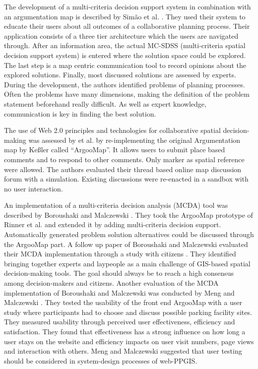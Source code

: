 The development of a multi-criteria decision support system in combination with an argumentation map is described by Sim\~{a}o et al. \cite{Simao2009Webbased}. They used their system to educate their users about all outcomes of a collaborative planning process. Their application consists of a three tier architecture which the users are navigated through. After an information area, the actual MC-SDSS (multi-criteria spatial decision support system) is entered where the solution space could be explored. The last step is a map centric communication tool to record opinions about the explored solutions. Finally, most discussed solutions are assessed by experts. During the development, the authors identified problems of planning processes. Often the problems have many dimensions, making the definition of the problem statement beforehand really difficult. As well as expert knowledge, communication is key in finding the best solution.

The use of Web 2.0 principles and technologies for collaborative spatial decision-making was assessed by \cite{Rinner2009_Web2_argumap} et al. by re-implementing the original Argumentation map by Ke{\ss}ler \cite{Kessler2005_ArgumentationMapPrototype} called ``ArgooMap''. It allows users to submit place based comments and to respond to other comments. Only marker as spatial reference were allowed. The authors evaluated their thread based online map discussion forum with a simulation. Existing discussions were re-enacted in a sandbox with no user interaction. 

An implementation of a multi-criteria decision analysis (MCDA) tool was described by Boroushaki and Malczewski \cite{Boroushaki2010_ParticipatoryGIS}. They took the ArgooMap prototype of Rinner et al. \cite{Rinner2009_Web2_argumap} and extended it by adding multi-criteria decision support. Automatically generated problem solution alternatives could be discussed through the ArgooMap part. A follow up paper of Boroushaki and Malczewski evaluated their MCDA implementation through a study with citizens \cite{Boroushaki2010_Consensus_measurement}. They identified bringing together experts and laypeople as a main challenge of GIS-based spatial decision-making tools. The goal should always be to reach a high consensus among decision-makers and citizens. Another evaluation of the MCDA implementation of Boroushaki and Malczewski was conducted by Meng and Malczewski \cite{Meng2010_ArgooMap_evaluation}. They tested the usability of the front end ArgooMap with a user study where participants had to choose and discuss possible parking facility sites. They measured usability through perceived user effectiveness, efficiency and satisfaction. They found that effectiveness has a strong influence on how long a user stays on the website and efficiency impacts on user visit numbers, page views and interaction with others. Meng and Malczewski suggested that user testing should be considered in system-design processes of web-PPGIS.
 
